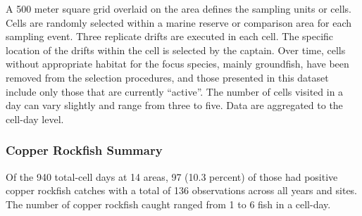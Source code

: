 \documentclass[11pt,
  english,
  a4paper,
]{article}
\begin{document}
\leavevmode\tagmcend\tagstructend\par


A 500 meter square grid overlaid on the area defines the sampling units or cells. Cells are randomly selected within a marine reserve or comparison area for each sampling event. Three replicate drifts are executed in each cell. The specific location of the drifts within the cell is selected by the captain. Over time, cells without appropriate habitat for the focus species, mainly groundfish, have been removed from the selection procedures, and those presented in this dataset include only those that are currently ``active''. The number of cells visited in a day can vary slightly and range from three to five. Data are aggregated to the cell-day level.

\leavevmode\tagmcend\tagstructend\par


\hypertarget{copper-rockfish-summary}{%
\subsubsection{Copper Rockfish Summary}\label{copper-rockfish-summary}}

\leavevmode\tagmcend\tagstructend


Of the 940 total-cell days at 14 areas, 97 (10.3 percent) of those had positive copper rockfish catches with a total of 136 observations across all years and sites. The number of copper rockfish caught ranged from 1 to 6 fish in a cell-day.

\leavevmode\tagmcend\tagstructend\par

\begingroup\fontsize{10}{12}\selectfont
\end{document}
